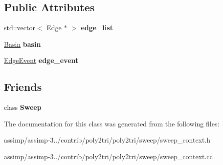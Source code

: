 \subsection*{Public Attributes}
\begin{DoxyCompactItemize}
\item 
\hypertarget{classp2t_1_1_sweep_context_ab5da3232dd8284254ecdedbec3047ea0}{std\+::vector$<$ \hyperlink{structp2t_1_1_edge}{Edge} $\ast$ $>$ {\bfseries edge\+\_\+list}}\label{classp2t_1_1_sweep_context_ab5da3232dd8284254ecdedbec3047ea0}

\item 
\hypertarget{classp2t_1_1_sweep_context_a79c599f974533a926b6a9ec73870e7d4}{\hyperlink{structp2t_1_1_sweep_context_1_1_basin}{Basin} {\bfseries basin}}\label{classp2t_1_1_sweep_context_a79c599f974533a926b6a9ec73870e7d4}

\item 
\hypertarget{classp2t_1_1_sweep_context_a86a138afe29697cfcd33158ec59c663e}{\hyperlink{structp2t_1_1_sweep_context_1_1_edge_event}{Edge\+Event} {\bfseries edge\+\_\+event}}\label{classp2t_1_1_sweep_context_a86a138afe29697cfcd33158ec59c663e}

\end{DoxyCompactItemize}
\subsection*{Friends}
\begin{DoxyCompactItemize}
\item 
\hypertarget{classp2t_1_1_sweep_context_a908f328c298fc585c89c0ab14546aeba}{class {\bfseries Sweep}}\label{classp2t_1_1_sweep_context_a908f328c298fc585c89c0ab14546aeba}

\end{DoxyCompactItemize}


The documentation for this class was generated from the following files\+:\begin{DoxyCompactItemize}
\item 
assimp/assimp-\/3../contrib/poly2tri/poly2tri/sweep/sweep\+\_\+context.\+h\item 
assimp/assimp-\/3../contrib/poly2tri/poly2tri/sweep/sweep\+\_\+context.\+cc\end{DoxyCompactItemize}
